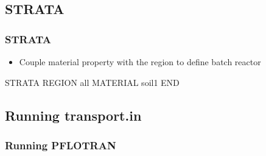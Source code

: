 \documentclass{beamer}
\begin{document}
\subsection{STRATA}

\begin{frame}[fragile]\frametitle{STRATA}

\begin{itemize}
\item Couple material property with the region to define batch reactor
\end{itemize}

\begin{semiverbatim}

STRATA
  REGION all
  MATERIAL soil1
END


\end{semiverbatim}

\end{frame}

\subsection{Running transport.in}

\begin{frame}[fragile]\frametitle{Running PFLOTRAN}


\end{frame}
\end{document}

